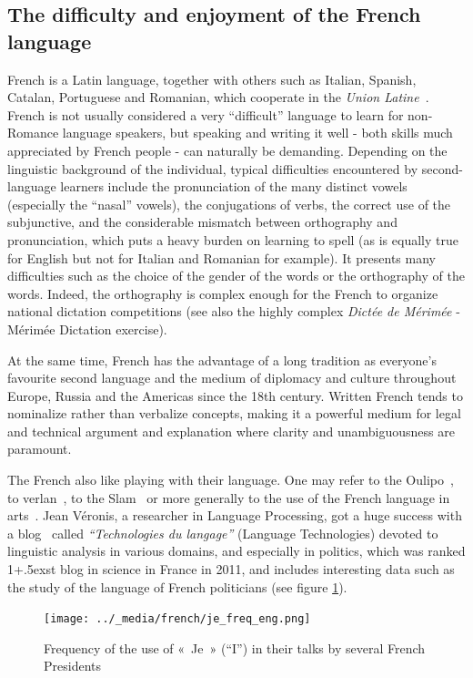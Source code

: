 \begin{multicols}{2}
\subsection{The difficulty and enjoyment of the French language}
French is a Latin language, together with others such as Italian,
Spanish, Catalan, Portuguese and Romanian, which cooperate in the
{\em Union Latine}~\cite{ulatine}. French is not usually considered a very ``difficult''
language to learn for non-Romance language speakers, but speaking and
writing it well - both skills much appreciated by French people - can
naturally be demanding. Depending on the linguistic background of the
individual, typical difficulties encountered by second-language
learners include the pronunciation of the many distinct vowels
(especially the ``nasal'' vowels), the conjugations of verbs, the
correct use of the subjunctive, and the considerable mismatch between
orthography and pronunciation, which puts a heavy burden on learning
to spell (as is equally true for English but not for Italian and
Romanian for example). It presents many difficulties such as the
choice of the gender of the words or the orthography of the
words. Indeed, the orthography is complex enough for the French to
organize national dictation competitions (see also the highly complex
{\em Dictée de Mérimée} - Mérimée Dictation exercise).  

At the same time, French has the advantage of a long tradition as
everyone's favourite second language and the medium of diplomacy and
culture throughout Europe, Russia and the Americas since the 18th
century. Written French tends to nominalize rather than verbalize
concepts, making it a powerful medium for legal and technical argument
and explanation where clarity and unambiguousness are paramount.

The French also like playing with their language. One may refer to the
Oulipo~\cite{oulipo}, to verlan~\cite{plenat95}, to the Slam~\cite{slam} or more generally to the use of the
French language in arts~\cite{arts}. Jean Véronis, a researcher in Language
Processing, got a huge success with a blog~\cite{veronis} called {\em ``Technologies du
langage''} (Language Technologies) devoted to linguistic analysis in various domains, and
especially in politics, which was ranked 1\raise+.5ex\hbox{st} blog in science in France
in 2011, and includes interesting data such as the study of the
language of French politicians (see figure \ref{fig:je_stats_en}).

\begin{figure}[ht]
\begin{center}
 \texttt{[image: ../\_media/french/je\_freq\_eng.png]} 
  \caption{Frequency of the use of «~Je~» (``I'') in their talks by several French Presidents}
  \label{fig:je_stats_en}
\end{center}
\end{figure}


\end{multicols}
